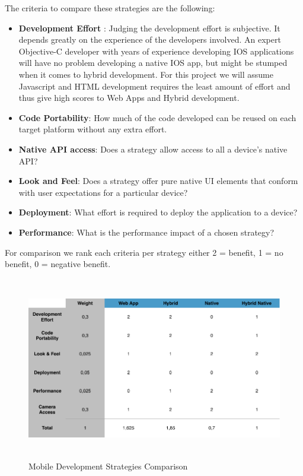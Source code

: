 The criteria to compare these strategies are the following:

\begin{itemize}[label={}]

\item \textbf{Development Effort }: Judging the development effort is subjective. It depends greatly on the experience of the developers involved. An expert Objective-C developer with years of experience developing IOS applications will have no problem developing a native IOS app, but might be stumped when it comes to hybrid development. For this project we will assume Javascript and HTML development requires the least amount of effort and thus give high scores to Web Apps and Hybrid development.

\item \textbf{Code Portability}: How much of the code developed can be reused on each target platform without any extra effort.

\item \textbf{Native API access}: Does a strategy allow access to all a device’s native API?

\item \textbf{Look and Feel}: Does a strategy offer pure native UI elements that conform with user expectations for a particular device?

\item \textbf{Deployment}: What effort is required to deploy the application to a device?

\item \textbf{Performance}: What is the performance impact of a chosen strategy?

\end{itemize}

For comparison we rank each criteria per strategy either 2 = benefit, 1 = no benefit, 0 = negative benefit.

\begin{figure}[H]
    \centering
    \includegraphics[height=8cm,keepaspectratio]{assets/concept/native_vs_hybrid.pdf}
    \caption{Mobile Development Strategies Comparison}
    \label{fig:mob_strat}
\end{figure}

